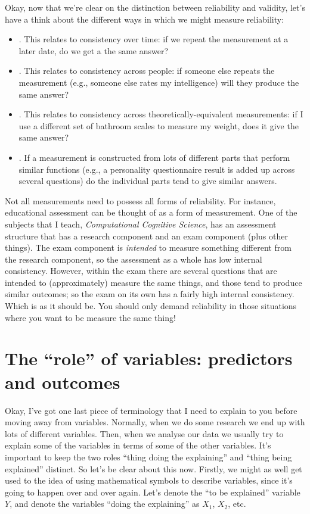 Okay, now that we're clear on the distinction between reliability and validity, let's have a think about the different ways in which we might measure reliability:

\begin{itemize}
\item {}. This relates to consistency over time: if we repeat the measurement at a later date, do we get a the same answer?
\item {}. This relates to consistency across people: if someone else repeats the measurement (e.g., someone else rates my intelligence) will they produce the same answer?
\item {}. This relates to consistency across theoretically-equivalent measurements: if I use a different set of bathroom scales to measure my weight, does it give the same answer?
\item {}. If a measurement is constructed from lots of different parts  that perform similar functions (e.g., a personality questionnaire result is added up across several questions) do the individual parts tend to give similar answers. 
\end{itemize}

\noindent 
Not all measurements need to possess all forms of reliability. For instance, educational assessment can be thought of as a form of measurement. One of the subjects that I teach, {\it Computational Cognitive Science}, has an assessment structure that has a research component and an exam component (plus other things). The exam component is {\it intended} to measure something different from the research component, so the assessment as a whole has low internal consistency. However, within the exam there are several questions that are intended to (approximately) measure the same things, and those tend to produce similar outcomes; so the exam on its own has a fairly high internal consistency. Which is as it should be. You should only demand reliability in those situations where you want to be measure the same thing!


\section{The ``role'' of variables: predictors and outcomes \label{sec:ivdv}}

Okay, I've got one last piece of terminology that I need to explain to you before moving away from variables. Normally, when we do some research we end up with lots of different variables. Then, when we analyse our data we usually try to explain some of the variables in terms of some of the other variables. It's important to keep the two roles ``thing doing the explaining'' and ``thing being explained'' distinct. So let's be clear about this now. Firstly, we might as well get used to the idea of using mathematical symbols to describe variables, since it's going to happen over and over again. Let's denote the ``to be explained'' variable $Y$, and denote the variables ``doing the explaining'' as $X_1$, $X_2$, etc. 

